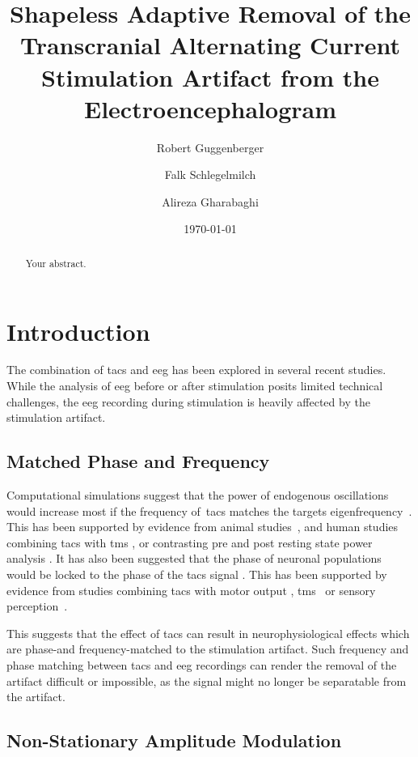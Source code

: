 \documentclass[a4paper]{article}
\title{Shapeless Adaptive Removal of the Transcranial Alternating Current Stimulation Artifact from the Electroencephalogram}
\author[1,*]{Robert Guggenberger}
\author[2]{Falk Schlegelmilch}
\author[1]{Alireza Gharabaghi}
\affil[1]{Department for Translational Neurosurgery, University Hospital Tübingen}
\affil[2]{neuroConn GmbH, Ilmenau}
\affil[*]{Corresponding author: \email{robert.guggenberger@posteo.eu}}
\date{\today}
\begin{document}
\maketitle
\thispagestyle{fancy}

\begin{abstract}
Your abstract.
\end{abstract}

\section{Introduction}

The combination of \gls{tacs} and \gls{eeg} has been explored in several recent studies. While the analysis of \gls{eeg} before or after stimulation posits limited technical challenges, the \gls{eeg} recording during stimulation is heavily affected by the stimulation artifact.

\subsection{Matched Phase and Frequency}
Computational simulations suggest that the power of endogenous oscillations would increase most if the frequency of~\gls{tacs} matches the targets eigenfrequency~\citep{Kutchko_2013,Zaehle_2010}.
This has been supported by evidence from animal studies~\citep{Schmidt_2014}, and human studies combining \gls{tacs} with \gls{tms} \citep{Guerra_2016}, or contrasting pre and post resting state power analysis \citep{Zaehle_2010}.
It has also been suggested that the phase of neuronal populations would be locked to the phase of the \gls{tacs} signal \citep{Reato_2013}. This has been supported by evidence from studies combining \gls{tacs} with motor output \citep{Brittain_2013}, \gls{tms}~\citep{Raco_2016,Nakazono_2016} or sensory perception~\citep{Gundlach_2016}.

This suggests that the effect of \gls{tacs} can result in neurophysiological effects which are phase-and frequency-matched to the stimulation artifact. Such frequency and phase matching between \gls{tacs} and \gls{eeg} recordings can render the removal of the artifact difficult or impossible, as the signal might no longer be separatable from the artifact.

\subsection{Non-Stationary Amplitude Modulation}
\end{document}
